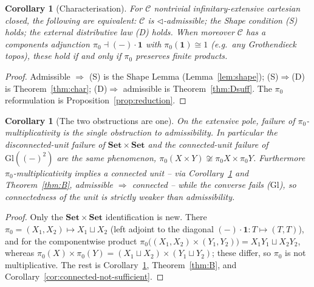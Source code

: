 \documentclass[11pt]{amsart}
\theoremstyle{plain}
\newtheorem{corollary}[theorem]{Corollary}
\theoremstyle{definition}
\newcommand{\C}{\mathcal{C}}
\newcommand{\Setb}{\mathbf{Set}}
\newcommand{\Gl}{\mathrm{Gl}}
\newcommand{\comp}{\mathbin{\triangleleft}}
\newcommand{\one}{\mathbf{1}}
\newcommand{\pizero}{\pi_0}
\begin{document}
\begin{corollary}[Characterisation]\label{cor:char}
For $\C$ nontrivial infinitary-extensive cartesian closed, the following are equivalent:
$\C$ is $\comp$-admissible; the Shape condition \emph{(S)} holds; the external distributive law
\emph{(D)} holds. When moreover $\C$ has a components adjunction $\pizero\dashv(-)\cdot\one$ with
$\pizero(\one)\cong1$ (e.g.\ any Grothendieck topos), these hold if and only if $\pizero$ preserves
finite products.
\end{corollary}
\begin{proof}
Admissible $\Rightarrow$ (S) is the Shape Lemma (Lemma~\ref{lem:shape}); (S)$\Rightarrow$(D) is
Theorem~\ref{thm:char}; (D)$\Rightarrow$ admissible is Theorem~\ref{thm:Dsuff}. The $\pizero$
reformulation is Proposition~\ref{prop:reduction}.
\end{proof}

\begin{corollary}[The two obstructions are one]\label{cor:unif}
On the extensive pole, failure of $\pizero$-multiplicativity is the \emph{single} obstruction to
admissibility. In particular the disconnected-unit failure of $\Setb\times\Setb$ and the
connected-unit failure of $\Gl((-)^2)$ are the same phenomenon, $\pizero(X\times Y)\not\cong\pizero
X\times\pizero Y$. Furthermore $\pizero$-multiplicativity implies a connected unit -- via
Corollary~\ref{cor:char} and Theorem~\ref{thm:B}, admissible $\Rightarrow$ connected -- while the
converse fails ($\Gl$), so connectedness of the unit is strictly weaker than admissibility.
\end{corollary}
\begin{proof}
Only the $\Setb\times\Setb$ identification is new. There $\pizero=(X_1,X_2)\mapsto X_1\sqcup X_2$ (left
adjoint to the diagonal $(-)\cdot\one:T\mapsto(T,T)$), and for the componentwise product
$\pizero\big((X_1,X_2)\times(Y_1,Y_2)\big)=X_1Y_1\sqcup X_2Y_2$, whereas
$\pizero(X)\times\pizero(Y)=(X_1\sqcup X_2)\times(Y_1\sqcup Y_2)$; these differ, so $\pizero$ is not
multiplicative. The rest is Corollary~\ref{cor:char}, Theorem~\ref{thm:B}, and
Corollary~\ref{cor:connected-not-sufficient}.
\end{proof}
\end{document}
